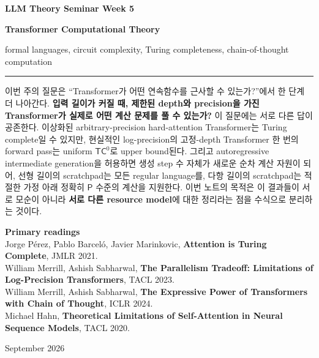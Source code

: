 \documentclass[11pt,a4paper,oneside,openany]{memoir}
\theoremstyle{definition}
\newcommand{\TC}{\mathsf{TC}}
\newcommand{\Pclass}{\mathsf{P}}
\begin{document}
\begin{titlingpage}
\thispagestyle{empty}
\vspace*{1.2cm}
{\small\bfseries LLM Theory Seminar \hfill Week 5\par}
\vspace{1.4cm}
{\HUGE\bfseries Transformer Computational Theory\par}
\vspace{0.55cm}
{\large formal languages, circuit complexity, Turing completeness, chain-of-thought computation\par}
\vspace{0.9cm}
\rule{\textwidth}{0.7pt}
\vspace{1.1cm}

\begin{minipage}{0.86\textwidth}
\small
이번 주의 질문은 ``Transformer가 어떤 연속함수를 근사할 수 있는가?''에서 한 단계 더 나아간다.
\textbf{입력 길이가 커질 때, 제한된 depth와 precision을 가진 Transformer가 실제로 어떤 계산 문제를 풀 수 있는가?}
이 질문에는 서로 다른 답이 공존한다. 이상화된 arbitrary-precision hard-attention Transformer는 Turing complete일 수 있지만,
현실적인 log-precision의 고정-depth Transformer 한 번의 forward pass는 uniform $\TC^0$로 upper bound된다.
그리고 autoregressive intermediate generation을 허용하면 생성 step 수 자체가 새로운 순차 계산 자원이 되어,
선형 길이의 scratchpad는 모든 regular language를, 다항 길이의 scratchpad는 적절한 가정 아래 정확히 $\Pclass$ 수준의 계산을 지원한다.
이번 노트의 목적은 이 결과들이 서로 모순이 아니라 \textbf{서로 다른 resource model}에 대한 정리라는 점을 수식으로 분리하는 것이다.
\end{minipage}

\vfill
{\small
\textbf{Primary readings}\\[0.25em]
Jorge Pérez, Pablo Barceló, Javier Marinkovic,
\textbf{Attention is Turing Complete}, JMLR 2021.\\
William Merrill, Ashish Sabharwal,
\textbf{The Parallelism Tradeoff: Limitations of Log-Precision Transformers}, TACL 2023.\\
William Merrill, Ashish Sabharwal,
\textbf{The Expressive Power of Transformers with Chain of Thought}, ICLR 2024.\\
Michael Hahn,
\textbf{Theoretical Limitations of Self-Attention in Neural Sequence Models}, TACL 2020.
\par}
\vspace{0.8cm}
{\small September 2026\par}
\end{titlingpage}
\end{document}
